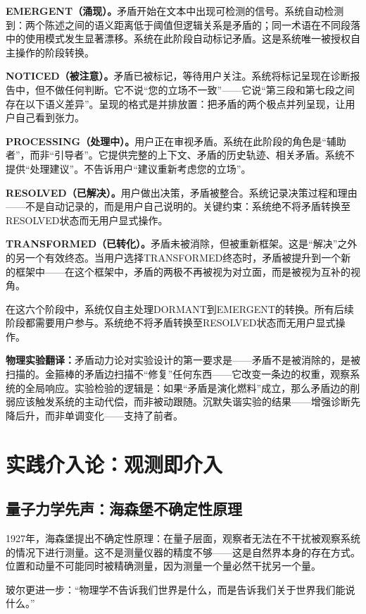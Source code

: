 \documentclass[11pt,a4paper]{book}
\theoremstyle{definition}
\begin{document}
\textbf{EMERGENT（涌现）。}矛盾开始在文本中出现可检测的信号。系统自动检测到：两个陈述之间的语义距离低于阈值但逻辑关系是矛盾的；同一术语在不同段落中的使用模式发生显著漂移。系统在此阶段自动标记矛盾。这是系统唯一被授权自主操作的阶段转换。

\textbf{NOTICED（被注意）。}矛盾已被标记，等待用户关注。系统将标记呈现在诊断报告中，但不做任何判断。它不说“您的立场不一致”——它说“第三段和第七段之间存在以下语义差异”。呈现的格式是并排放置：把矛盾的两个极点并列呈现，让用户自己看到张力。

\textbf{PROCESSING（处理中）。}用户正在审视矛盾。系统在此阶段的角色是“辅助者”，而非“引导者”。它提供完整的上下文、矛盾的历史轨迹、相关矛盾。系统不提供“处理建议”。不告诉用户“建议重新考虑您的立场”。

\textbf{RESOLVED（已解决）。}用户做出决策，矛盾被整合。系统记录决策过程和理由——不是自动记录的，而是用户自己说明的。关键约束：系统绝不将矛盾转换至RESOLVED状态而无用户显式操作。

\textbf{TRANSFORMED（已转化）。}矛盾未被消除，但被重新框架。这是“解决”之外的另一个有效终态。当用户选择TRANSFORMED终态时，矛盾被提升到一个新的框架中——在这个框架中，矛盾的两极不再被视为对立面，而是被视为互补的视角。

在这六个阶段中，系统仅自主处理DORMANT到EMERGENT的转换。所有后续阶段都需要用户参与。系统绝不将矛盾转换至RESOLVED状态而无用户显式操作。

\textbf{物理实验翻译：}矛盾动力论对实验设计的第一要求是——矛盾不是被消除的，是被扫描的。金箍棒的矛盾边扫描不“修复”任何东西——它改变一条边的权重，观察系统的全局响应。实验检验的逻辑是：如果“矛盾是演化燃料”成立，那么矛盾边的削弱应该触发系统的主动代偿，而非被动跟随。沉默失谐实验的结果——增强诊断先降后升，而非单调变化——支持了前者。

\section{实践介入论：观测即介入}

\subsection{量子力学先声：海森堡不确定性原理}

1927年，海森堡提出不确定性原理：在量子层面，观察者无法在不干扰被观察系统的情况下进行测量。这不是测量仪器的精度不够——这是自然界本身的存在方式。位置和动量不可能同时被精确测量，因为测量一个量必然干扰另一个量。

玻尔更进一步：“物理学不告诉我们世界是什么，而是告诉我们关于世界我们能说什么。”
\end{document}
